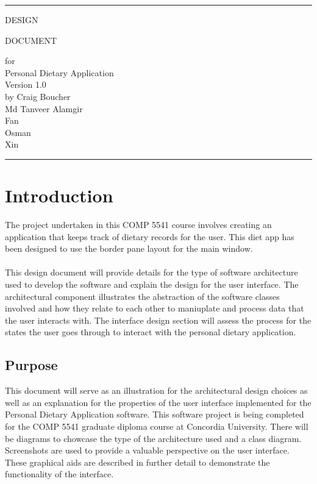 \documentclass{scrreprt}
\date{}
\def\myversion{1.0}
\begin{document}
\begin{titlepage}
  \flushright\bfseries\huge
    \rule{\linewidth}{5pt}
    \par
    \vspace{1cm}
    {\Huge DESIGN \par DOCUMENT \par}
    \vspace{2cm}
    for \\
    \vspace{2cm}
    Personal Dietary Application \\
    \vspace{2cm}
     \LARGE{Version \myversion \\}
    \vspace{2cm}
    by Craig Boucher \\
    Md Tanveer Alamgir \\
    Fan \\
    Osman \\
    Xin
    \vspace{2cm}
    \rule{\linewidth}{5pt}
\end{titlepage}
\tableofcontents
\chapter{Introduction}
The project undertaken in this COMP 5541 course involves creating an application that keeps track of dietary records for the user. This diet app has been designed to use the border pane layout for the main window. \\ \\ 
This design document will provide details for the type of software architecture used to develop the software and explain the design for the user interface. The architectural component illustrates the abstraction of the software classes involved and how they relate to each other to maniuplate and process data that the user interacts with. The interface design section will assess the process for the states the user goes through to interact with the personal dietary application.
\section{Purpose}
This document will serve as an illustration for the architectural design choices as well as an explanation for the properties of the user interface implemented for the Personal Dietary Application software. This software project is being completed for the COMP 5541 graduate diploma course at Concordia University. There will be diagrams to chowcase the type of the architecture used and a class diagram. Screenshots are used to provide a valuable perspective on the user interface. These graphical aids are described in further detail to demonstrate the functionality of the interface.
\end{document}
